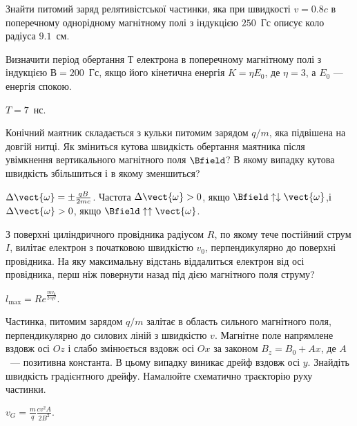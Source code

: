 \begin{problem}%
    Знайти питомий заряд релятивістської частинки, яка при швидкості $v = 0.8c$ в поперечному однорідному магнітному полі з індукцією $250$~Гс описує коло радіуса $9.1$~см.
\end{problem}


\begin{problem}%
    Визначити період обертання $Т$ електрона в поперечному магнітному полі з індукцією $В = 200$~Гс, якщо його кінетична енергія $K = \eta E_0$, де $\eta = 3$, а $E_0$ --- енергія спокою.
\begin{solution}
    $T = 7$~нс.
\end{solution}
\end{problem}

\begin{problem}
Конічний маятник складається з кульки питомим зарядом $q/m$,  яка підвішена на довгій нитці. Як зміниться кутова швидкість обертання маятника після увімкнення вертикального магнітного поля $\Bfield$?
В якому випадку кутова швидкість збільшиться і в якому зменшиться?
\begin{solution}
	$\Delta\vect{\omega} = \pm\frac{qB}{2mc}$. Частота $\Delta\vect{\omega}>0$, якщо $\Bfield \uparrow\downarrow \vect{\omega}$,і
	$\Delta\vect{\omega}>0$, якщо $\Bfield \uparrow\uparrow \vect{\omega}$.
\end{solution}
\end{problem}

\begin{problem}
З поверхні циліндричного провідника радіусом $R$, по якому тече постійний струм $I$, вилітає електрон з початковою швидкістю $v_0$, перпендикулярно до поверхні провідника. На яку максимальну відстань віддалиться електрон від осі провідника, перш ніж повернути назад під дією магнітного поля струму?
\begin{solution}
	$l_{\max} = Re^{\frac{mv_0}{2cqI}}$.
\end{solution}
\end{problem}

\begin{problem}
    Частинка, питомим зарядом $q/m$ залітає в область сильного магнітного поля, перпендикулярно до силових ліній з швидкістю $v$. Магнітне поле напрямлене вздовж осі $Oz$ і слабо змінюється вздовж осі $Ox$ за законом $B_z = B_0 + Ax$, де $A$~--- позитивна константа. В цьому випадку виникає дрейф вздовж осі $y$. Знайдіть швидкість градієнтного дрейфу. Намалюйте схематично траєкторію руху частинки.
\begin{solution}
	$v_G = \frac{m}{q}\frac{cv^2A}{2B^2}.$
\end{solution}
\end{problem}



